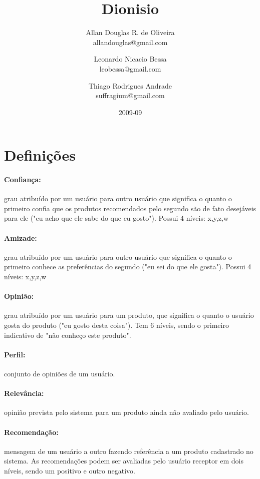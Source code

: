 \documentclass[a4paper,12pt]{article}
\title{Dionisio}
\author{Allan Douglas R. de Oliveira \\ allandouglas@gmail.com \and
Leonardo Nicacio Bessa \\ leobessa@gmail.com \and
Thiago Rodrigues Andrade \\ suffragium@gmail.com}
\date{2009-09}
\begin{document}
\ifpdf
{}
\else
{}
\fi


\pagestyle{empty}
\section{Definições}

\paragraph{Confiança:} grau atribuído por um usuário para outro usuário que significa o quanto o primeiro confia que os produtos recomendados pelo segundo são de fato desejáveis para ele ("eu acho que ele sabe do que eu gosto"). Possui 4 níveis: x,y,z,w

\paragraph{Amizade:} grau atribuído por um usuário para outro usuário que significa o quanto o primeiro conhece as preferências do segundo ("eu sei do que ele gosta"). Possui 4 níveis: x,y,z,w

\paragraph{Opinião:} grau atribuído por um usuário para um produto, que significa o quanto o usuário gosta do produto ("eu gosto desta coisa"). Tem 6 níveis, sendo o primeiro indicativo de "não conheço este produto".

\paragraph{Perfil:} conjunto de opiniões de um usuário.

\paragraph{Relevância:} opinião prevista pelo sistema para um produto ainda não avaliado pelo usuário.

\paragraph{Recomendação:} mensagem de um usuário a outro fazendo referência a um produto cadastrado no sistema. As recomendações podem ser avaliadas pelo usuário receptor em dois níveis, sendo um positivo e outro negativo.
\end{document}
